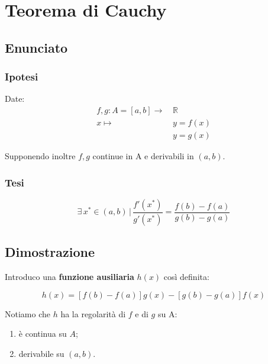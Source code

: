 \documentclass[../dimostrazioni]{subfiles}
\begin{document}
    \chapter{Teorema di Cauchy}
    \label{teoCauchy}

        \section*{Enunciato}

            \subsection*{Ipotesi}

                Date:
                \begin{align*}
                    f,g : A = [a, b] \longrightarrow \, &\mathbb{R}\\
                    x \longmapsto \, &y = f(x)\\
                                  &y = g(x) 
                \end{align*}

                Supponendo inoltre \(f, g\) continue in A e derivabili in \( (a,b) \).

            \subsection*{Tesi}

                \[ 
                    \exists \, x^* \in (a,b) \, | \, \frac{ f'(x^*) }{ g'(x^*) } = \frac{ f(b) - f(a) }{ g(b) - g(a) }
                \]

        \section*{Dimostrazione}

            Introduco una \textbf{funzione ausiliaria} \(h(x)\) così definita:

            \[ 
                h(x) = \left[f(b) - f(a)\right]g(x) - \left[g(b) - g(a)\right]f(x)
            \]

            Notiamo che \(h\) ha la regolarità di \(f\) e di \(g\) su A:
            \begin{enumerate}
                \indentitem \item è continua su \( A \);
                \indentitem \item derivabile su \( (a, b) \).
            \end{enumerate}
\end{document}
